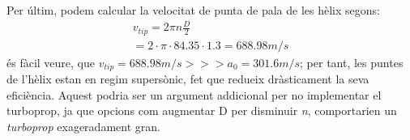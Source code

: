 \noindent Per últim, podem calcular la velocitat de punta de pala de les hèlix segons:
\begin{multline}
	v_{tip}=2\pi n\frac{D}{2} \\
	=2\cdot\pi\cdot84.35\cdot 1.3=688.98m/s
\end{multline}
és fàcil veure, que $v_{tip}=688.98m/s >>> a_0 =  301.6m/s$; per tant, les puntes de l'hèlix estan en regim supersònic, fet que redueix dràsticament la seva eficiència. Aquest podria ser un argument addicional per no implementar el turboprop, ja que opcions com augmentar D per disminuir \textit{n}, comportarien un \textit{turboprop} exageradament gran.
